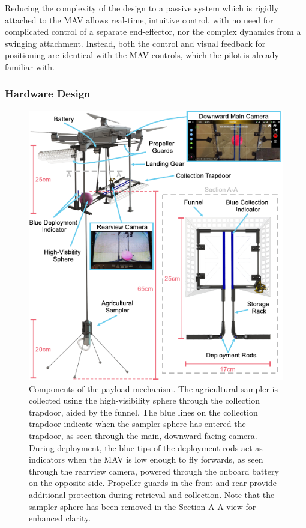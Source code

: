 Reducing the complexity of the design to a passive system which is rigidly attached to the \gls{MAV} allows real-time, intuitive control, with no need for complicated control of a separate end-effector, nor the complex dynamics from a swinging attachment. Instead, both the control and visual feedback for positioning are identical with the \gls{MAV} controls, which the pilot is already familiar with. 

\subsubsection{Hardware Design}
\begin{figure}[!tp]
\centering
\includegraphics[width=0.9\columnwidth]{chapters/papers/UR/figures/fig-2-hardware/fig-2-hardware.pdf}
\caption{Components of the payload mechanism. The agricultural sampler is collected using the high-visibility sphere through the collection trapdoor, aided by the funnel. The blue lines on the collection trapdoor indicate when the sampler sphere has entered the trapdoor, as seen through the main, downward facing camera. During deployment, the blue tips of the deployment rods act as indicators when the \gls{MAV} is low enough to fly forwards, as seen through the rearview camera, powered through the onboard battery on the opposite side. Propeller guards in the front and rear provide additional protection during retrieval and collection. Note that the sampler sphere has been removed in the Section A-A view for enhanced clarity.}
\label{fig:fig2-hardware}
\figurevspacebelow
\end{figure}

